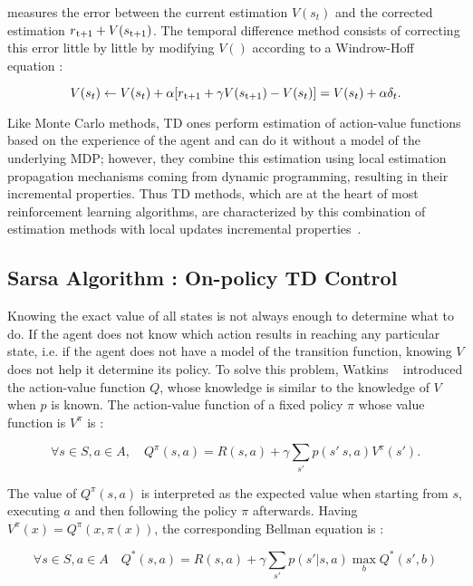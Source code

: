 measures the error between the current estimation $V(s_t)$ and the corrected estimation $r\textsubscript{t+1} + V(s\textsubscript{t+1})$. The temporal difference method consists of correcting this error little by little by modifying $V()$ according to a Windrow-Hoff equation :

\begin{equation}
	V(s_t) \leftarrow V(s_t) + \alpha[r\textsubscript{t+1} + \gamma V(s\textsubscript{t+1}) - V(s_t)] = V(s_t) + \alpha \delta_t .
\end{equation}

Like Monte Carlo methods, TD ones perform estimation of action-value functions based on the experience of the agent and can do it without a model of the underlying MDP; however, they combine this estimation using local estimation propagation mechanisms coming from dynamic programming, resulting in their incremental properties. Thus TD methods, which are at the heart of most reinforcement learning algorithms, are characterized by this combination of estimation methods with local updates incremental properties~\cite{Sigaud:2010:MDP:1841781}.

\subsection{Sarsa Algorithm : On-policy TD Control} Knowing the exact value of all states is not always enough to determine what to do. If the agent does not know which action results in reaching any particular state, i.e. if the agent does not have a model of the transition function, knowing $V$ does not help it determine its policy.  To solve this problem, Watkins ~\cite{watkins1992q} introduced the action-value function $Q$, whose knowledge is similar to the knowledge of $V$ when $p$ is known. The action-value function of a fixed policy $\pi$ whose value function is $V^\pi$ is :

\begin{equation}
	\forall s \in S, a \in A, \quad Q^\pi (s,a) = R(s, a) + \gamma \sum_{s'} p(s' \ s, a) V^\pi (s').
\end{equation}

The value of $Q^\pi(s,a)$ is interpreted as the expected value when starting from $s$, executing $a$ and then following the policy $\pi$ afterwards. Having $V^\pi(x) = Q^\pi(x, \pi(x))$, the corresponding Bellman equation is :

\begin{equation}
	\forall s \in S, a \in A \quad Q^*(s, a) = R(s, a) + \gamma \sum_{s'}p(s' | s, a) \max_{b} Q^*(s', b)
\end{equation}

